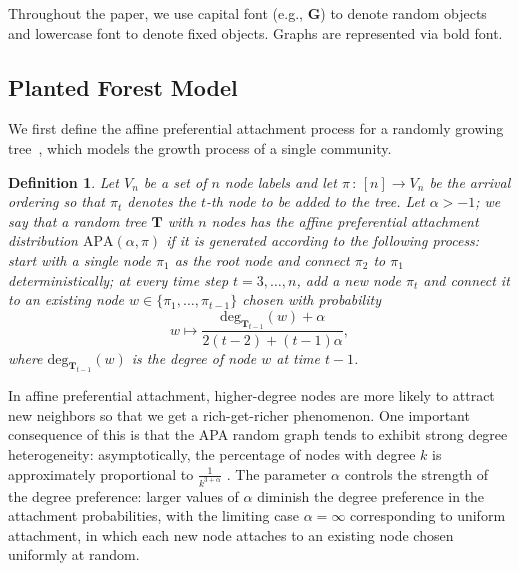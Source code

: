 \documentclass[twoside,11pt]{article}
\newtheorem{defin}[theorem]{Definition}
\theoremstyle{remark}
\begin{document}

Throughout the paper, we use capital font (e.g., $\boldsymbol{G}$) to denote random objects and lowercase font to denote fixed objects. Graphs are represented via bold font.


\subsection{Planted Forest Model}

We first define the affine preferential attachment process for a randomly growing tree~\citep{crane2021inference}, which models the growth process of a single community.

\begin{defin}
\label{defin: APA}
Let $V_n$ be a set of $n$ node labels and let $\pi \,:\, [n]  \rightarrow V_n$ be the arrival ordering so that $\pi_t$ denotes the $t$-th node to be added to the tree. Let $\alpha > -1$; we say that a random tree $\boldsymbol{T}$ with $n$ nodes has the affine preferential attachment distribution $\mathrm{APA}(\alpha, \pi)$ if it is generated according to the following process: start with a single node $\pi_1$ as the root node and connect $\pi_2$ to $\pi_1$ deterministically; at every time step $t = 3, \ldots, n$, add a new node $\pi_t$ and connect it to an existing node $w \in \{\pi_1, \ldots, \pi_{t-1}\}$ chosen with probability
%
\begin{equation}
\label{defin: attachment rule 1}  
w \mapsto \frac{ \mathrm{deg}_{\bm{T}_{t-1}}(w) + \alpha}{2(t-2)+ (t-1)\alpha},
\end{equation}
%
where $\mathrm{deg}_{\bm{T}_{t-1}}(w)$ is the degree of node $w$ at time $t-1$. 

\end{defin}

In affine preferential attachment, higher-degree nodes are more likely to attract new neighbors so that we get a rich-get-richer phenomenon. One important consequence of this is that the APA random graph tends to exhibit strong degree heterogeneity: asymptotically, the percentage of nodes with degree $k$ is approximately proportional to $\frac{1}{k^{3 + \alpha}}$ \citep[][Section 8.4]{van2024random}. The parameter $\alpha$ controls the strength of the degree preference: larger values of $\alpha$ diminish the degree preference in the attachment probabilities, with the limiting case $\alpha = \infty$ corresponding to uniform attachment, in which each new node attaches to an existing node chosen uniformly at random. 
\end{document}
